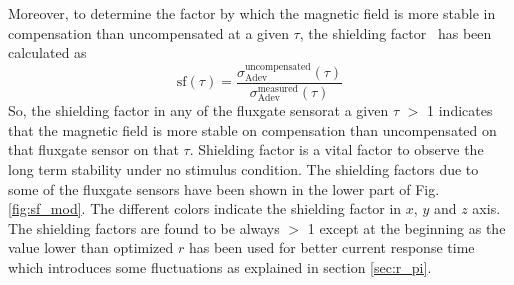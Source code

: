 \FloatBarrier

Moreover, to determine the factor by which the magnetic field is more stable in compensation than uncompensated at a given $\tau$, the shielding factor~\cite{bea} has been calculated as
\begin{equation}\label{eq:sf}
    \text{sf} (\tau)=\frac{\sigma_{\text{Adev}}^{\text{uncompensated}}(\tau)}{\sigma_{\text{Adev}}^{\text{measured}}(\tau)}
\end{equation}
So, the shielding factor in any of the fluxgate sensorat a given $\tau$  $>$ 1 indicates that the magnetic field is more stable on compensation than uncompensated on that fluxgate sensor on that $\tau$. Shielding factor is a vital factor to observe the long term stability under no stimulus condition. The shielding factors due to some of the fluxgate sensors have been shown in the lower part of Fig. \ref{fig:sf_mod}. The different colors indicate the  shielding factor in $x$, $y$ and $z$ axis. The shielding factors are found to be always $>$ 1 except at the beginning as the value lower than optimized $r$ has been used for better current response time which introduces some fluctuations as explained in section \ref{sec:r_pi}.
 

 
 
 